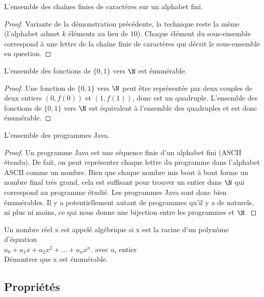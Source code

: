 \begin{myexem}
\begin{myexem}
\label{exem:chaines_finies}
  L'ensemble des chaînes finies de caractères sur un alphabet fini.
\begin{proof}
 Variante de la démonstration précédente, la technique reste la même (l'alphabet admet $k$ éléments au lieu de $10$). Chaque élément du sous-ensemble correspond à une lettre de la chaîne finie de caractères qui décrit le sous-ensemble en question.
\end{proof}
\end{myexem}

\begin{myexem}
 L'ensemble des fonctions de  $\{0, 1\}$ vers $\N$ est énumérable.
 \begin{proof}
  Une fonction de $\{0, 1\}$ vers $\N$ peut être représentée par deux couples de deux entiers $(0, f(0))$ et $(1, f(1))$, donc est un quadruple. L'ensemble des fonctions de $\{0, 1\}$ vers $\N$ est équivalent à l'ensemble des quadruples et est donc énumérable.
 \end{proof}
\end{myexem}

 \begin{myexem}
 \label{exem:programme_java}
  L'ensemble des programmes Java.
  \begin{proof}
   Un programme Java est une séquence finie d'un alphabet fini (ASCII étendu). De fait, on peut représenter chaque lettre du programme dans l'alphabet ASCII comme un nombre. Bien que chaque nombre mis bout à bout forme un nombre final très grand, cela est suffisant pour trouver un entier dans $\N$ qui correspond au programme étudié. Les programmes Java sont donc bien énumérables. Il y a potentiellement autant de programmes qu'il y a de naturels, ni plus ni moins, ce qui nous donne une bijection entre les programmes et $\N$.
  \end{proof}
\end{myexem}

\begin{myexercice} \label{exerc:ensembleEnumNumAlgebrique}
Un nombre réel x est appelé algébrique si x est la racine d'un polynôme d'équation\\
\indent $a_0 + a_1x + a_2x^2 + ... + a_nx^n$.  avec $a_i$ entier\\
Démontrer que x est énumérable.
\end{myexercice}

\subsection{Propriétés}
\label{subsec:proprietes}


\end{myexem}
